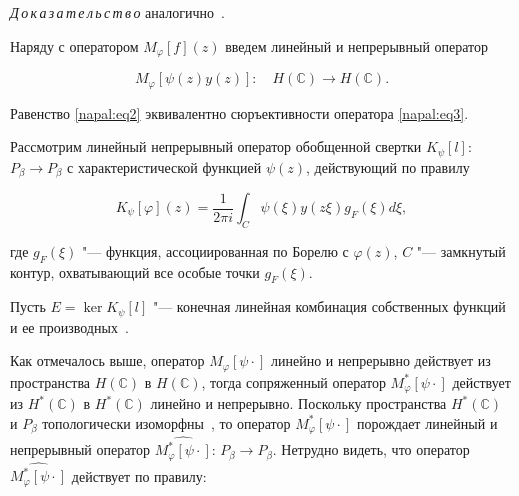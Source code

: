 \textit{Д\,о\,к\,а\,з\,а\,т\,е\,л\,ь\,с\,т\,в\,о}\/ аналогично~\cite[c.~166]{napal:bib18}.



Наряду с оператором $M_\varphi [f](z)$ введем линейный и непрерывный оператор

\begin{equation}

\label{napal:eq3}

 M_\varphi [\psi(z) y(z)]: \quad H(\mathbb{C}) \to H(\mathbb{C}).

  \end{equation}



\smallskip



\hypertarget{napalk:lemma1}{}



\begin{lemma}Равенство \eqref{napal:eq2} эквивалентно сюръективности оператора \rm \eqref{napal:eq3}.

\end{lemma}



\smallskip



Рассмотрим линейный непрерывный оператор обобщенной свертки $K_\psi[l]$: $P_\beta\to P_\beta$ с характеристической функцией $\psi(z)$, действующий по правилу

  \begin{equation}\label{napal:eq4}

 K_\psi [\varphi](z)=\frac{1}{2\pi i}\int _C \psi(\xi) y(z \xi) g_F(\xi)d\xi,

  \end{equation}

где $g_F(\xi)$ "--- функция, ассоциированная по Борелю с $\varphi(z)$, $C$ "--- замкнутый контур, охватывающий все особые точки $g_F(\xi)$.



Пусть $E=\ker K_\psi[l]$ "--- конечная линейная комбинация собственных функций и ее производных~\cite[теорема~2]{napal:bib12}. %



Как отмечалось выше, оператор $M_\varphi [\psi \cdot]$ линейно и непрерывно действует из пространства $H(\mathbb{C})$ в $H(\mathbb{C})$, тогда сопряженный оператор $M^*_\varphi [\psi \cdot]$ действует из $H^*(\mathbb{C})$ в $H^*(\mathbb{C})$ линейно и непрерывно. Поскольку пространства $H^*(\mathbb{C})$ и $P_\beta$ топологически изоморфны~\cite{napal:bib11}, то оператор $M^*_\varphi [\psi \cdot]$ порождает линейный и непрерывный оператор $\widehat{M^*_\varphi [\psi \cdot]}$: $P_\beta \to P_\beta$. Нетрудно видеть, что оператор $\widehat{M^*_\varphi [\psi \cdot]}$ действует по правилу: 

